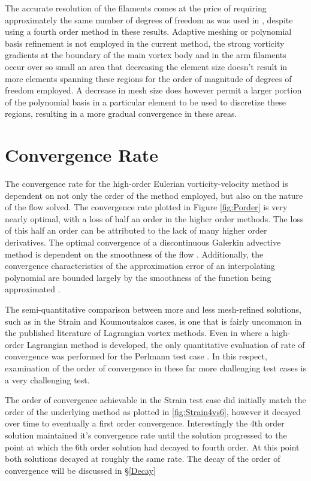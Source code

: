 \documentclass[letterpaper,12pt]{report}
\begin{document}
The accurate resolution of the filaments comes at the price of requiring approximately the same number of degrees of freedom as was used in \cite{Koum1997}, despite using a fourth order method in these results. Adaptive meshing or polynomial basis refinement is not employed in the current method, the strong vorticity gradients at the boundary of the main vortex body and in the arm filaments occur over so small an area that decreasing the element size doesn't result in more elements spanning these regions for the order of magnitude of degrees of freedom employed. A decrease in mesh size does however permit a larger portion of the polynomial basis in a particular element to be used to discretize these regions, resulting in a more gradual convergence in these areas.

\section{Convergence Rate}
The convergence rate for the high-order Eulerian vorticity-velocity method is dependent on not only the order of the method employed, but also on the nature of the flow solved. The convergence rate plotted in Figure \ref{fig:Porder} is very nearly optimal, with a loss of half an order in the higher order methods. The loss of this half an order can be attributed to the lack of many higher order derivatives. The optimal convergence of a discontinuous Galerkin advective method is dependent on the smoothness of the flow \cite{HestWar}. Additionally, the convergence characteristics of the approximation error of an interpolating polynomial are bounded largely by the smoothness of the function being approximated \cite{Roni}.

The semi-quantitative comparison between more and less mesh-refined solutions, such as in the Strain and Koumoutsakos cases, is one that is fairly uncommon in the published literature of Lagrangian vortex methods. Even in \cite{Strain1996} where a high-order Lagrangian method is developed, the only quantitative evaluation of rate of convergence was performed for the Perlmann test case \cite{Perlmann1985}. In this respect, examination of the order of convergence in these far more challenging test cases is a very challenging test.

The order of convergence achievable in the Strain test case did initially match the order of the underlying method as plotted in \ref{fig:Strain4vs6}, however it decayed over time to eventually a first order convergence. Interestingly the 4th order solution maintained it's convergence rate until the solution progressed to the point at which the 6th order solution had decayed to fourth order. At this point both solutions decayed at roughly the same rate. The decay of the order of convergence will be discussed in \S\ref{Decay}
\end{document}
